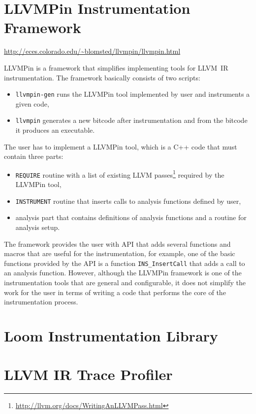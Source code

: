 \section{LLVMPin Instrumentation Framework}

\url{http://eces.colorado.edu/~blomsted/llvmpin/llvmpin.html}
\medskip

LLVMPin is a framework that simplifies implementing tools for LLVM~IR
instrumentation. The framework basically consists of two scripts:

\begin{itemize}
    \item \texttt{llvmpin-gen} runs the LLVMPin tool implemented by
          user and instruments a given code,
    \item \texttt{llvmpin} generates a new
	  bitcode after instrumentation and from the bitcode it produces an
          executable.
\end{itemize}

The user has to implement a LLVMPin tool, which is a C++ code that must contain three
parts:

\begin{itemize}
    \item \texttt{REQUIRE} routine with a list of existing LLVM
          passes\footnote{\url{http://llvm.org/docs/WritingAnLLVMPass.html}} required by
          the LLVMPin tool,
    \item \texttt{INSTRUMENT} routine that inserts calls to analysis functions
          defined by user,
    \item analysis part that contains definitions of analysis functions and a
          routine for analysis setup.
\end{itemize}

The framework provides the user with API that adds several functions and macros
that are useful for the instrumentation, for example, one of the basic
functions provided by the API is a function \texttt{INS\_InsertCall} that adds
a call to an analysis function. However, although the LLVMPin framework is one
of the instrumentation tools that are general and configurable, it does not
simplify the work for the user in terms of writing a code that performs the
core of the instrumentation process.

\section{Loom Instrumentation Library}

\section{LLVM IR Trace Profiler}

